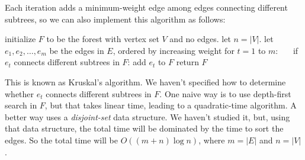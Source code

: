 Each iteration adds a minimum-weight edge among edges connecting different subtrees,
so we can also implement this algorithm as follows:

\begin{myframed}
  \begin{steps}
  \item[{{\sf Kruskal}$(G=(V,E))$:}]
    \step initialize  $F$ to be the forest with vertex set $V$ and no edges.  let $n=|V|$.
    \step let $e_1, e_2, \ldots, e_m$ be the edges in $E$, ordered by increasing weight
    \step for $t=1$ to $m$:
    \step~~~if $e_t$ connects different subtrees in $F$: add $e_t$ to $F$
    \step return $F$
  \end{steps}
\end{myframed}

This is known as Kruskal's algorithm.
We haven't specified how to determine whether $e_t$ connects different subtrees in $F$.
One naive way is to use depth-first search in $F$,
but that takes linear time, leading to a quadratic-time algorithm.
A better way uses a \emph{disjoint-set} data structure.
We haven't studied it, but, using that data structure,
the total time will be dominated by the time to sort the edges.
So the total time will be $O((m+n)\log n)$, where $m=|E|$ and $n=|V|$.




